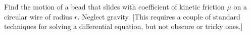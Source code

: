 Find the motion of
a bead that slides with coefficient of kinetic friction $\mu$ on a circular wire of radius $r$.
Neglect gravity.
[This requires a couple of standard techniques for solving a differential equation, but not
obscure or tricky ones.]
